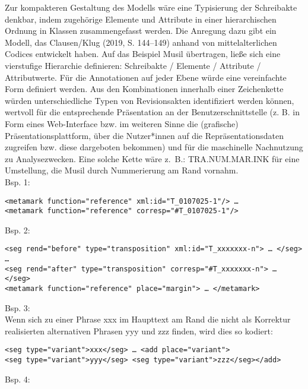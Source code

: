 \documentclass{article}
\begin{document}
        Zur kompakteren Gestaltung des Modells wäre eine Typisierung der Schreibakte
                  denkbar, indem zugehörige Elemente und Attribute in einer hierarchischen Ordnung
                  in Klassen zusammengefasst werden. Die Anregung dazu gibt ein Modell, das
                  Clausen/Klug (2019, S. 144–149) anhand von mittelalterlichen Codices
                  entwickelt haben. Auf das Beispiel Musil übertragen, ließe sich eine vierstufige
                  Hierarchie definieren: Schreibakte / Elemente / Attribute / Attributwerte. Für die
                  Annotationen auf jeder Ebene würde eine vereinfachte Form definiert werden. Aus
                  den Kombinationen innerhalb einer Zeichenkette würden unterschiedliche Typen von
                  Revisionsakten identifiziert werden können, wertvoll für die entsprechende
                  Präsentation an der Benutzerschnittstelle (z. B. in Form eines Web-Interface bzw.
                  im weiteren Sinne die (grafische) Präsentationsplattform, über die Nutzer*innen
                  auf die Repräsentationsdaten zugreifen bzw. diese dargeboten bekommen) und für die
                  maschinelle Nachnutzung zu Analysezwecken. Eine solche Kette wäre z. B.:
                  TRA.NUM.MAR.INK für eine Umstellung, die Musil durch Nummerierung am Rand vornahm. \\
            
        Bsp. 1:\\
            
        \begin{verbatim}<metamark function="reference" xml:id="T_0107025-1"/> …
<metamark function="reference" corresp="#T_0107025-1"/>\end{verbatim}Bsp. 2:\\
            
        \begin{verbatim}<seg rend="before" type="transposition" xml:id="T_xxxxxxx-n"> … </seg> … 
<seg rend="after" type="transposition" corresp="#T_xxxxxxx-n"> … </seg>
<metamark function="reference" place="margin"> … </metamark>\end{verbatim}Bsp. 3:\\
            
        Wenn sich zu einer Phrase xxx im Haupttext am Rand die nicht als Korrektur
realisierten alternativen Phrasen yyy und zzz finden, wird dies so kodiert:\\
            
        \begin{verbatim}<seg type="variant">xxx</seg> … <add place="variant">
<seg type="variant">yyy</seg> <seg type="variant">zzz</seg></add>\end{verbatim}Bsp. 4:\\
            
\end{document}
